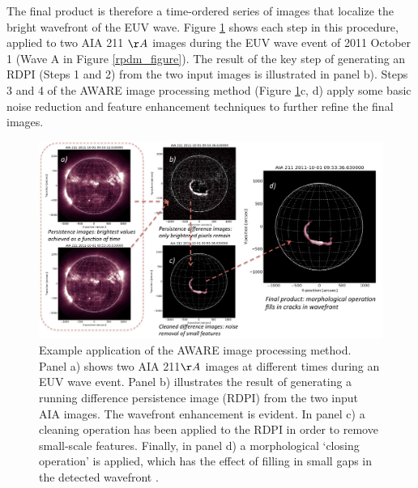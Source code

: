 The final product is therefore a time-ordered series of images that localize the bright wavefront of the EUV wave. Figure \ref{method_figure} shows each step in this procedure, applied to two AIA 211 $\AA$ images during the EUV wave event of 2011 October 1 (Wave A in Figure \ref{rpdm_figure}). The result of the key step of generating an RDPI (Steps 1 and 2) from the two input images is illustrated in panel b). Steps 3 and 4 of the AWARE image processing method (Figure \ref{method_figure}c, d) apply some basic noise reduction and feature enhancement techniques to further refine the final images.  

\begin{figure}
\begin{center}
\includegraphics[width=16cm]{aware_figure4.pdf}
\caption{Example application of the AWARE image processing method. Panel a) shows two AIA 211$\AA$ images at different times during an EUV wave event. Panel b) illustrates the result of generating a running difference persistence image (RDPI) from the two input AIA images. The wavefront enhancement is evident. In panel c) a cleaning operation has been applied to the RDPI in order to remove small-scale features. Finally, in panel d) a morphological `closing operation' is applied, which has the effect of filling in small gaps in the detected wavefront \citep[e.g.][]{2002dip..book.....G}.}
\label{method_figure}
\end{center}
\end{figure}


